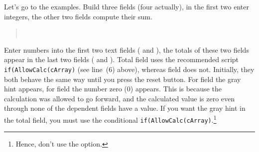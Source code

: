 \documentclass{article}
\begin{document}
Let's go to the examples. Build three fields (four actually), in the first two
enter integers, the other two fields compute their sum.
\begin{quote}\previewOff
{}\ \vcgBdry[3bp]
\ \vcgBdry[3bp]
\ \vcgBdry[3bp]
\ \cgBdry[1em]
\end{quote}
Enter numbers into the first two text fields ( and ), the
totals of these two fields appear in the last two fields ( and
). Total field  uses the recommended script
\texttt{if(AllowCalc(cArray)} (see line~(6) above), whereas field 
does not. Initially, they both behave the same way until you press the reset
button. For field  the gray hint appears, for field  the
number zero (0) appears. This is because the calculation was allowed to go
forward, and the calculated value is zero even through none of the dependent
fields have a value. If you want the gray hint in the total field, you must
use the conditional \texttt{if(AllowCalc(cArray)}.\footnote{Hence, don't use the  option.}
\end{document}
